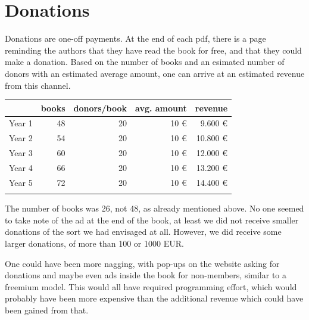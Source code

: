 \documentclass[nonflat,smallfont
]{langsci/langscibook}
\newcommand{\background}[1]{ 
  \vspace{5mm}
  \renewcommand{\tblslinecolour}{lsDarkBlue}
  \tblssy[red]{explore2}{Background}{\vspace*{-5mm}#1}
}
\newcommand{\langscisolution}[1]{
  \renewcommand{\tblslinecolour}{lsLightBlue}
  \tblssy{langsci}{LangSci solution}{\vspace*{-5mm}#1}
}
\newcommand{\evaluation}[1]{
  \renewcommand{\tblslinecolour}{lsLightOrange}
  \tblssy{receipt}{Evaluation}{\vspace*{-5mm}#1}
}
\newcommand{\othersolutions}[1]{
  \renewcommand{\tblslinecolour}{lsDarkGreenOne}
  \tblssy{more}{Other solutions}{\vspace*{-5mm}#1}
}
\renewcommand{\tblssy}[4][black!12]{%
  \renewcommand{\langscisymbol}{#2}\renewcommand{\tblsboxcolor}{#1}
  \begin{mdframed}[style=yellowexercise,frametitle={#3}]
    #4
  \end{mdframed}
}
\begin{document}
\section{Donations} 
\background{Donations are one-off payments. At the end of each pdf, there is a page reminding the authors that they have read the book for free, and that they could make a donation. Based on the number of books and an esimated number of donors with an estimated average amount, one can arrive at an estimated revenue from this channel.}
\langscisolution{
\begin{tabularx}{\textwidth}{Xrrrr}
\lsptoprule 
          &   books   & donors/book &   avg. amount     &  revenue\\
\midrule  
Year 1   &   48      &            20      &            10 €     &                      9.600 €  \\
Year 2   &   54      &            20      &            10 €     &                      10.800 € \\
Year 3   &   60      &            20      &            10 €     &                      12.000 € \\
Year 4   &   66      &            20      &            10 €     &                      13.200 € \\
Year 5   &   72      &            20      &            10 €     &                      14.400 € \\
\lspbottomrule
\end{tabularx}
}
\evaluation{
The number of books was 26, not 48, as already mentioned above. No one seemed to take note of the ad at the end of the book, at least we did not receive smaller donations of the sort we had envisaged at all. However, we did receive some larger donations, of more than 100 or 1000 EUR. 
}
\othersolutions{One could have been more nagging, with pop-ups on the website asking for donations and maybe even ads inside the book for non-members, similar to a freemium model. This would all have required programming effort, which would probably have been more expensive than the additional revenue which could have been gained from that. }
\end{document}
